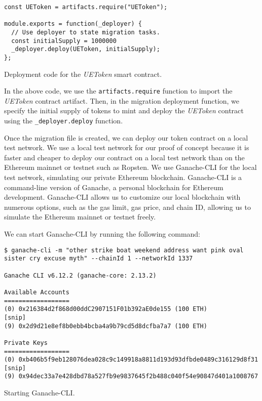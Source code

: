 \begin{listing}[H]
    \begin{verbatim}
const UEToken = artifacts.require("UEToken");

module.exports = function(_deployer) {
  // Use deployer to state migration tasks.
  const initialSupply = 1000000
  _deployer.deploy(UEToken, initialSupply);
};
    \end{verbatim}
    \caption{Deployment code for the \textit{UEToken} smart contract.}
    \label{lst:truffle_uetoken_migration}
\end{listing}

In the above code, we use the \texttt{artifacts.require} function to import the \textit{UEToken} contract artifact. Then, in the migration
deployment function, we specify the initial supply of tokens to mint and deploy the \textit{UEToken} contract using the \texttt{\_deployer.deploy} function.

Once the migration file is created, we can deploy our token contract on a local test network. We use a local test network for our proof of concept
because it is faster and cheaper to deploy our contract on a local test network than on the Ethereum mainnet or testnet such as Ropsten.
We use Ganache-CLI \cite{trufflesuite_ganachecli} for the local test network, simulating our private Ethereum blockchain. Ganache-CLI is a command-line version of Ganache, a personal blockchain
for Ethereum development. Ganache-CLI allows us to customize our local blockchain with numerous options, such as the gas limit, gas price, and chain ID, allowing
us to simulate the Ethereum mainnet or testnet freely.

We can start Ganache-CLI by running the following command:

\begin{listing}[H]
    \begin{verbatim}
$ ganache-cli -m "other strike boat weekend address want pink oval sister cry excuse myth" --chainId 1 --networkId 1337 

Ganache CLI v6.12.2 (ganache-core: 2.13.2)

Available Accounts
==================
(0) 0x216384d2f868d00ddC2907151F01b392aE0de155 (100 ETH)
[snip]
(9) 0x2d9d21e8ef8b0ebb4bcba4a9b79cd5d8dcfba7a7 (100 ETH)

Private Keys
==================
(0) 0xb406b5f9eb128076dea028c9c149918a8811d193d93dfbde0489c316129d8f31
[snip]
(9) 0x94dec33a7e428dbd78a527fb9e9837645f2b488c040f54e90847d401a1008767
    \end{verbatim}
    \caption{Starting Ganache-CLI.}
    \label{lst:ganache_cli}
\end{listing}

